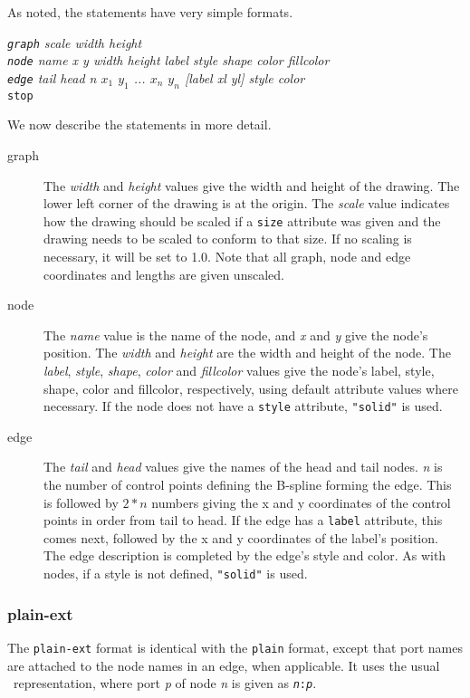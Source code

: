 As noted, the statements have very simple formats.
\begin{tabbing}
\indent \indent \= {\em {\tt graph} scale width height} \\
        \> {\em {\tt node} name x y width height label style shape color fillcolor} \\
        \> {\em {\tt edge} tail head n $x_1$ $y_1$ ... $x_n$ $y_n$ [label xl yl] style color} \\
        \> {\tt stop}
\end{tabbing}
       
We now describe the statements in more detail.
\begin{description}
\item[graph] 
The {\em width} and {\em height} values give the 
width and height of the drawing. The 
lower left corner of the drawing is at the origin. 
The {\em scale} value indicates 
how the drawing should be scaled if a {\tt size} attribute was given and the 
drawing needs to be scaled to conform to that size. If no scaling is 
necessary, it will be set to 1.0. Note that all graph, node and edge 
coordinates and lengths are given unscaled. 
\item[node] 
The {\em name} value is the name of the node, and 
{\em x} and {\em y} give the node's position. 
The {\em width} and {\em height} are the width and height of the node. 
The {\em label}, {\em style},
{\em shape}, {\em color} and {\em fillcolor} values 
give the node's label, style, shape, color and 
fillcolor, respectively, using default attribute values where necessary. 
If the node does not have a {\tt style} attribute, {\tt "solid"} is used. 
\item[edge] 
The {\em tail} and {\em head} values give the names of the head and tail nodes. 
{\em n} is the number of control points defining the B-spline forming the edge.
This is followed by $2*n$ numbers giving the x and y coordinates of the 
control points in order from tail to head. If the edge has a {\tt label}
attribute, 
this comes next, followed by the x and y coordinates of the label's position. 
The edge description is completed by the edge's style and color. As with 
nodes, if a style is not defined, {\tt "solid"} is used. 
\end{description}

\subsubsection{plain-ext}
The {\tt plain-ext} format is identical with the {\tt plain} format,
except that port names are attached to the node names in an edge,
when applicable. It uses the usual \DOT\ representation, where port
{\em p} of node {\em n} is given as {\tt {\em n}:{\em p}}.

